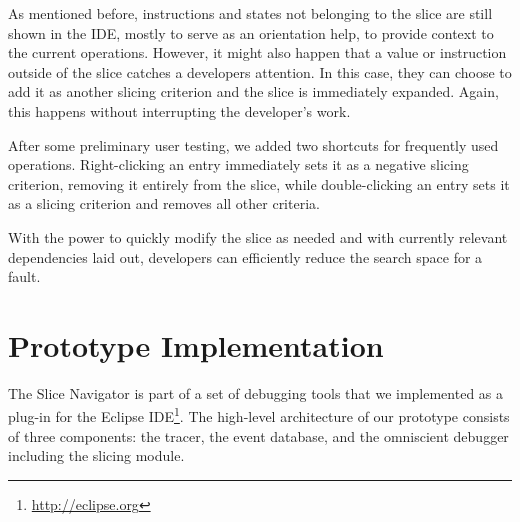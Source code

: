 As mentioned before, instructions and states not belonging to the slice are still shown in the IDE, mostly to serve as an orientation help, to provide context to the current operations.
However, it might also happen that a value or instruction outside of the slice catches a developers attention.
In this case, they can choose to add it as another slicing criterion and the slice is immediately expanded.
Again, this happens without interrupting the developer's work.

After some preliminary user testing, we added two shortcuts for frequently used operations.
Right-clicking an entry immediately sets it as a negative slicing criterion, removing it entirely from the slice, while double-clicking an entry sets it as a slicing criterion and removes all other criteria.

With the power to quickly modify the slice as needed and with currently relevant dependencies laid out, developers can efficiently reduce the search space for a fault.



\section{Prototype Implementation}
\label{sec:impl}

The Slice Navigator is part of a set of debugging tools that we implemented as a plug-in for the Eclipse IDE\footnote{\url{http://eclipse.org}}.
%
%
The high-level architecture of our prototype consists of three components: the tracer, the event database, and the omniscient debugger including the slicing module.

%
%


